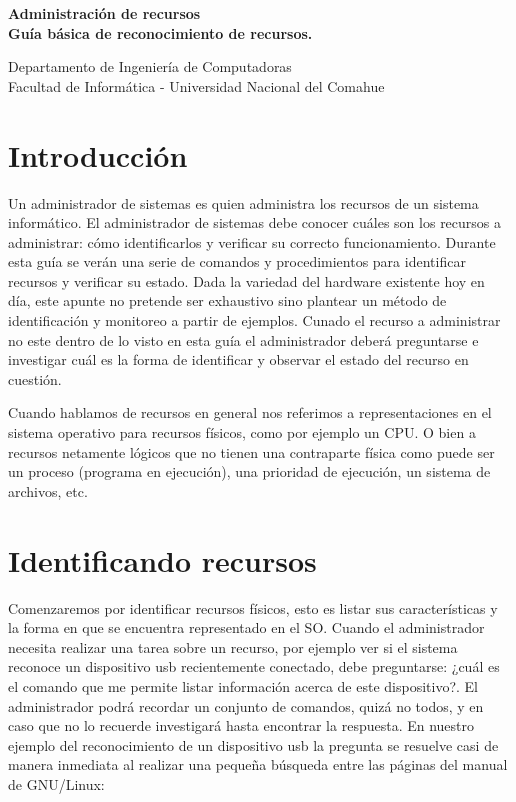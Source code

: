 \documentclass[12pt]{article}
\def\maketitle{

 \makeatletter
 {\color{bl} \centering \huge \sc \textbf{
 Administración de recursos \\ 
\large \vspace*{-8pt} \color{black} Guía básica de reconocimiento de recursos. 
 \vspace*{8pt} }\par}
 \makeatother


 \makeatletter
 {\centering \small 
 	Departamento de Ingeniería de Computadoras \\
 	Facultad de Informática - Universidad Nacional del Comahue \\
 	\vspace{20pt} }
 \makeatother

}
\begin{document}
\thispagestyle{empty}
\maketitle
\setlength{\parindent}{0pt}

\section*{Introducción}

Un administrador de sistemas es quien administra los recursos de un sistema informático. El administrador
de sistemas debe conocer cuáles son los recursos a administrar: cómo identificarlos y verificar su 
correcto funcionamiento. Durante esta guía se verán una serie de comandos y procedimientos para identificar 
recursos y verificar su estado. Dada la variedad del hardware existente hoy en día, este apunte no pretende
ser exhaustivo sino plantear un método de identificación y monitoreo a partir de ejemplos. Cunado 
el recurso a administrar no este dentro de lo visto en esta guía el administrador deberá preguntarse e
investigar cuál es la forma de identificar y observar el estado del recurso en cuestión. 

Cuando hablamos de recursos en general nos referimos a representaciones en el sistema operativo para 
recursos físicos, como por ejemplo un CPU. O bien a recursos netamente lógicos que no tienen una
contraparte física como puede ser un proceso (programa en ejecución), una prioridad de ejecución, 
un sistema de archivos, etc. 


\section*{Identificando recursos}

Comenzaremos por identificar recursos físicos, esto es listar sus características y la forma en que 
se encuentra representado en el SO. Cuando el administrador necesita realizar una tarea
sobre un recurso, por ejemplo ver si el sistema reconoce un dispositivo usb recientemente conectado, 
debe preguntarse: ¿cuál es el comando que me permite listar información acerca de este dispositivo?. 
El administrador podrá recordar un conjunto de comandos, quizá no todos, y en caso que no lo recuerde
investigará hasta encontrar la respuesta. En nuestro ejemplo del reconocimiento de un dispositivo 
usb la pregunta se resuelve casi de manera inmediata al realizar una pequeña búsqueda entre las páginas
del manual de GNU/Linux: 
\end{document}
